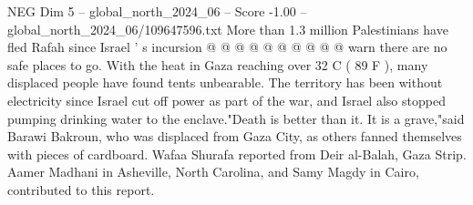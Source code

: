\begin{textsample}{NEG Dim 5 – global\_north\_2024\_06 – Score -1.00 – global\_north\_2024\_06/109647596.txt}
More than 1.3 million Palestinians have fled Rafah since Israel ' s incursion @ @ @ @ @ @ @ @ @ @ warn there are no safe places to go.
With the heat in Gaza reaching over 32 C ( 89 F ), many displaced people have found tents unbearable.
The territory has been without electricity since Israel cut off power as part of the war, and Israel also stopped pumping drinking water to the enclave."Death is better than it.
It is a grave,"said Barawi Bakroun, who was displaced from Gaza City, as others fanned themselves with pieces of cardboard.
Wafaa Shurafa reported from Deir al-Balah, Gaza Strip.
Aamer Madhani in Asheville, North Carolina, and Samy Magdy in Cairo, contributed to this report.

\end{textsample}
